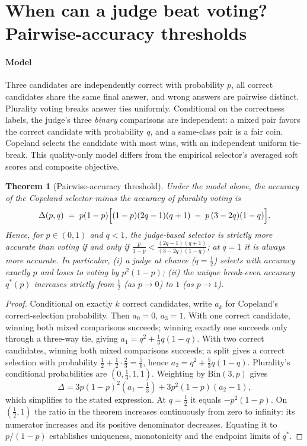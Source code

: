 \documentclass[preprint,11pt,number,sort&compress]{elsarticle}
\newtheorem{theorem}{Theorem}[section]
\begin{document}
\section{When can a judge beat voting? Pairwise-accuracy thresholds}
\label{sec:theory}

\paragraph{Model} Three candidates are independently correct with probability
$p$, all correct candidates share the same final answer, and wrong answers
are pairwise distinct. Plurality voting breaks answer ties uniformly.
Conditional on the correctness labels, the judge's three \emph{binary}
comparisons are independent: a mixed pair favors the correct candidate
with probability $q$, and a same-class pair is a fair coin. Copeland
selects the candidate with most wins, with an independent uniform tie-break.
This quality-only model differs from the empirical selector's averaged
soft scores and composite objective.

\begin{theorem}[Pairwise-accuracy threshold]
\label{thm:threshold}
Under the model above, the accuracy of the Copeland selector minus the accuracy of plurality
voting is
\[
\Delta(p,q)\;=\;p(1-p)\Bigl[(1-p)(2q-1)(q+1)\;-\;p\,(3-2q)(1-q)\Bigr].
\]
Hence, for $p\in(0,1)$ and $q<1$, the judge-based selector is strictly more accurate than voting
if and only if $\frac{p}{1-p}<\frac{(2q-1)(q+1)}{(3-2q)(1-q)}$; at $q=1$ it is always more accurate. In particular, (i) a judge at
chance ($q=\tfrac12$) selects with accuracy exactly $p$ and loses to voting by
$p^{2}(1-p)$; (ii) the unique break-even accuracy $q^{*}(p)$ increases strictly from $\tfrac12$
(as $p\to0$) to $1$ (as $p\to1$).
\end{theorem}

\begin{proof}
Conditional on exactly $k$ correct candidates, write $a_k$ for Copeland's
correct-selection probability. Then $a_0=0$, $a_3=1$.
With one correct candidate, winning both mixed comparisons succeeds;
winning exactly one succeeds only through a three-way tie, giving
$a_1=q^2+\tfrac13q(1-q)$. With two correct candidates, winning both
mixed comparisons succeeds; a split gives a correct selection with
probability $\tfrac12+\tfrac12\cdot\tfrac23=\tfrac56$, hence
$a_2=q^2+\tfrac53q(1-q)$. Plurality's conditional probabilities are
$(0,\tfrac13,1,1)$. Weighting by $\mathrm{Bin}(3,p)$ gives
\[
\Delta=3p(1-p)^2(a_1-\tfrac13)+3p^2(1-p)(a_2-1),
\]
which simplifies to the stated expression. At $q=\tfrac12$ it equals
$-p^2(1-p)$. On $(\tfrac12,1)$ the ratio in the theorem increases
continuously from zero to infinity: its numerator increases and its
positive denominator decreases. Equating it to $p/(1-p)$ establishes
uniqueness, monotonicity and the endpoint limits of $q^*$.
\end{proof}
\end{document}
